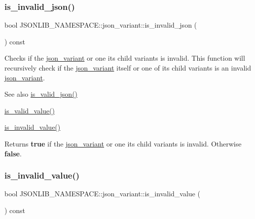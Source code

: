 \subsubsection{\texorpdfstring{is\+\_\+invalid\+\_\+json()}{is\_invalid\_json()}}
{\footnotesize\ttfamily bool J\+S\+O\+N\+L\+I\+B\+\_\+\+N\+A\+M\+E\+S\+P\+A\+C\+E\+::json\+\_\+variant\+::is\+\_\+invalid\+\_\+json (\begin{DoxyParamCaption}{ }\end{DoxyParamCaption}) const}



Checks if the \hyperlink{classJSONLIB__NAMESPACE_1_1json__variant}{json\+\_\+variant} or one its child variants is invalid. This function will recursively check if the \hyperlink{classJSONLIB__NAMESPACE_1_1json__variant}{json\+\_\+variant} itself or one of its child variants is an invalid \hyperlink{classJSONLIB__NAMESPACE_1_1json__variant}{json\+\_\+variant}. 

\begin{DoxySeeAlso}{See also}
\hyperlink{classJSONLIB__NAMESPACE_1_1json__variant_a158e3148d9256af3d1b8251b2ca7b6c4}{is\+\_\+valid\+\_\+json()} 

\hyperlink{classJSONLIB__NAMESPACE_1_1json__variant_a224aab2dd56e3928dd893be8b7f3367a}{is\+\_\+valid\+\_\+value()} 

\hyperlink{classJSONLIB__NAMESPACE_1_1json__variant_ab6552a5e3de90ab1fbca078e5c245bfb}{is\+\_\+invalid\+\_\+value()} 
\end{DoxySeeAlso}
\begin{DoxyReturn}{Returns}
{\bfseries true} if the \hyperlink{classJSONLIB__NAMESPACE_1_1json__variant}{json\+\_\+variant} or one it\textquotesingle{}s child variants is invalid. Otherwise {\bfseries false}. 
\end{DoxyReturn}
\mbox{\label{classJSONLIB__NAMESPACE_1_1json__variant_ab6552a5e3de90ab1fbca078e5c245bfb}} 
\subsubsection{\texorpdfstring{is\+\_\+invalid\+\_\+value()}{is\_invalid\_value()}}
{\footnotesize\ttfamily bool J\+S\+O\+N\+L\+I\+B\+\_\+\+N\+A\+M\+E\+S\+P\+A\+C\+E\+::json\+\_\+variant\+::is\+\_\+invalid\+\_\+value (\begin{DoxyParamCaption}{ }\end{DoxyParamCaption}) const}



